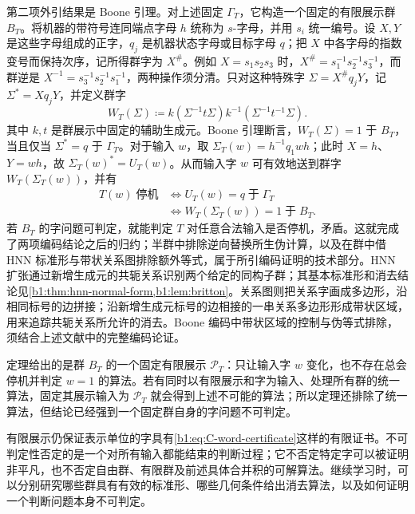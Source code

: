 \begin{proofsketch}
	第二项外引结果是 Boone 引理\cite[Lemma 12.7, p. 431]{Rotman1995TheoryGroups}。对上述固定 \(\Gamma_T\)，它构造一个固定的有限展示群 \(B_T\)。将机器的带符号连同端点字母 \(h\) 统称为 \(s\)-字母，并用 \(s_i\) 统一编号。设 \(X,Y\) 是这些字母组成的正字，\(q_j\) 是机器状态字母或目标字母 \(q\)；把 \(X\) 中各字母的指数变号而保持次序，记所得群字为 \(X^\#\)。例如 \(X=s_1s_2s_3\) 时，\(X^\#=s_1^{-1}s_2^{-1}s_3^{-1}\)，而群逆是 \(X^{-1}=s_3^{-1}s_2^{-1}s_1^{-1}\)，两种操作须分清。只对这种特殊字 \(\Sigma=X^\#q_jY\)，记 \(\Sigma^*=Xq_jY\)，并定义群字
	\[
		W_T(\Sigma)\coloneqq k(\Sigma^{-1}t\Sigma)k^{-1}(\Sigma^{-1}t^{-1}\Sigma).
	\]
	其中 \(k,t\) 是群展示中固定的辅助生成元。Boone 引理断言，\(W_T(\Sigma)=1\) 于 \(B_T\)，当且仅当 \(\Sigma^*=q\) 于 \(\Gamma_T\)。对于输入 \(w\)，取 \(\Sigma_T(w)=h^{-1}q_1wh\)；此时 \(X=h\)、\(Y=wh\)，故 \(\Sigma_T(w)^*=U_T(w)\)。从而输入字 \(w\) 可有效地送到群字 \(W_T(\Sigma_T(w))\)，并有
	\[
		\begin{aligned}
			T(w)\;\text{停机} &\Longleftrightarrow U_T(w)=q\;\text{于}\;\Gamma_T\\
			&\Longleftrightarrow W_T(\Sigma_T(w))=1\;\text{于}\;B_T.
		\end{aligned}
	\]
	若 \(B_T\) 的字问题可判定，就能判定 \(T\) 对任意合法输入是否停机，矛盾。这就完成了两项编码结论之后的归约；半群中排除逆向替换所生伪计算，以及在群中借 HNN 标准形与带状关系图排除额外等式，属于所引编码证明的技术部分\cite[pp. 427--428, 432--447]{Rotman1995TheoryGroups}。HNN 扩张通过新增生成元的共轭关系识别两个给定的同构子群；其基本标准形和消去结论见\cref{b1:thm:hnn-normal-form,b1:lem:britton}。关系图则把关系字画成多边形，沿相同标号的边拼接；沿新增生成元标号的边相接的一串关系多边形形成带状区域，用来追踪共轭关系所允许的消去。Boone 编码中带状区域的控制与伪等式排除，须结合上述文献中的完整编码论证。
\end{proofsketch}

定理给出的是群 \(B_T\) 的一个固定有限展示 \(\mathcal P_T\)：只让输入字 \(w\) 变化，也不存在总会停机并判定 \(w=1\) 的算法。若有同时以有限展示和字为输入、处理所有群的统一算法，固定其展示输入为 \(\mathcal P_T\) 就会得到上述不可能的算法；所以定理还排除了统一算法，但结论已经强到一个固定群自身的字问题不可判定。

\ProseParagraphBreak
有限展示仍保证表示单位的字具有\eqref{b1:eq:C-word-certificate}这样的有限证书。不可判定性否定的是一个对所有输入都能结束的判断过程；它不否定特定字可以被证明非平凡，也不否定自由群、有限群及前述具体合并积的可解算法。继续学习时，可以分别研究哪些群具有有效的标准形、哪些几何条件给出消去算法，以及如何证明一个判断问题本身不可判定。

